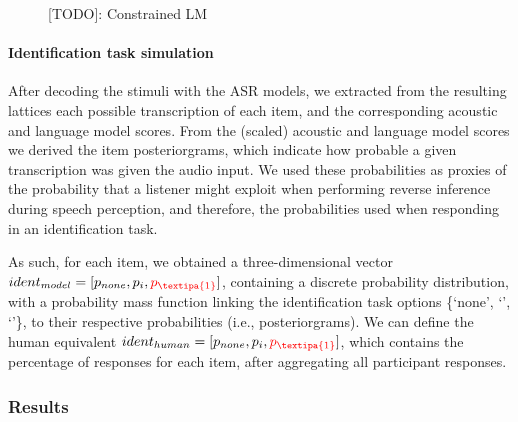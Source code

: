 {\begin{figure}[htb]
    \centering
    \caption{{\color{red}[TODO]: Constrained LM}}%
    \label{fig:k-epenth_G}
  \end{figure}
  
\paragraph{Identification task simulation}
After decoding the stimuli with the ASR models, we extracted from the resulting lattices each possible transcription of each item, and the corresponding acoustic and language model scores. %
From the (scaled) acoustic and language model scores we derived the item posteriorgrams, which indicate how probable a given transcription was given the audio input. We used these probabilities as proxies of the probability that a listener might exploit when performing reverse inference during speech perception, and therefore, the probabilities used when responding in an identification task. 

As such, for each item, we obtained a three-dimensional vector $ident_{model} = [p_{none}, p_{i}, {\color{red}p_{\textipa{1}}}]$, containing a discrete probability distribution, with a probability mass function linking the identification task options \{`none', `', `'\}, to their respective probabilities (i.e., posteriorgrams).
We can define the human equivalent $ident_{human} = [p_{none}, p_{i}, {\color{red}p_{\textipa{1}}}]$, which contains the percentage of responses for each item, after aggregating all participant responses.

\subsubsection{Results}

}
